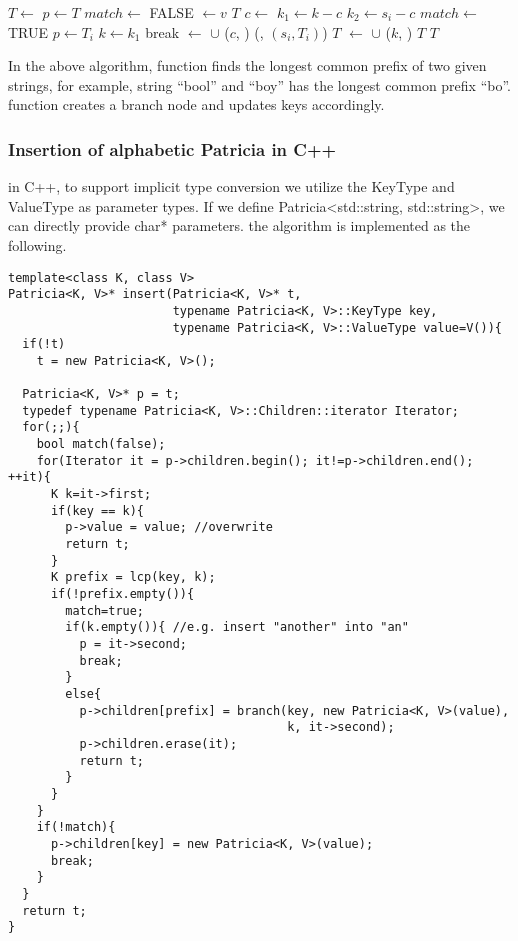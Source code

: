 \documentclass{article}
\begin{document}
\begin{algorithmic}[1]
   \State $T \gets$ 
  \EndIf
  \State $p \gets T$
  \Loop
    \State $match \gets$ FALSE
        \State {} $\gets v$
        \State \Return $T$
      \EndIf
      \State $c \gets$ 
      \State $k_1 \gets k - c$
      \State $k_2 \gets s_i - c$
        \State $match \gets$ TRUE
         
          \State $p \gets T_i$
          \State $k \gets k_1$
          \State break
        \Else {}
          \State {} $\gets$  $\cup$ ($c$, )
          \State {}(, $(s_i, T_i)$)
          \State \Return $T$
        \EndIf
      \EndIf
    \EndFor
     
      \State {} $\gets$  $\cup$ ($k$, )
      \State \Return $T$
    \EndIf
  \EndLoop
  \State \Return $T$
\EndFunction
\end{algorithmic}

In the above algorithm,  function finds the longest
common prefix of two given strings, for example, string ``bool'' and ``boy''
has the longest common prefix ``bo''.  function creates a branch node
and updates keys accordingly.

\subsubsection*{Insertion of alphabetic Patricia in C++}
in C++, to support implicit type conversion we utilize the KeyType and
ValueType as parameter types. If we define Patricia<std::string,
std::string>, we can directly provide char* parameters. the algorithm
is implemented as the following.

\lstset{language=C++}
\begin{lstlisting}
template<class K, class V>
Patricia<K, V>* insert(Patricia<K, V>* t,
                       typename Patricia<K, V>::KeyType key,
                       typename Patricia<K, V>::ValueType value=V()){
  if(!t)
    t = new Patricia<K, V>();

  Patricia<K, V>* p = t;
  typedef typename Patricia<K, V>::Children::iterator Iterator;
  for(;;){
    bool match(false);
    for(Iterator it = p->children.begin(); it!=p->children.end(); ++it){
      K k=it->first;
      if(key == k){
        p->value = value; //overwrite
        return t;
      }
      K prefix = lcp(key, k);
      if(!prefix.empty()){
        match=true;
        if(k.empty()){ //e.g. insert "another" into "an"
          p = it->second;
          break;
        }
        else{
          p->children[prefix] = branch(key, new Patricia<K, V>(value),
                                       k, it->second);
          p->children.erase(it);
          return t;
        }
      }
    }
    if(!match){
      p->children[key] = new Patricia<K, V>(value);
      break;
    }
  }
  return t;
}
\end{lstlisting}
\end{document}
